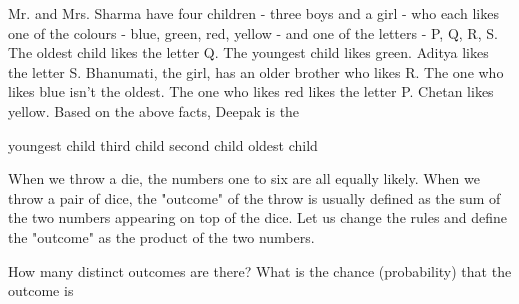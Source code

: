 \documentclass[12pt]{exam}
\begin{document}
\begin{questions}

\question Mr. and Mrs. Sharma have four children - three boys and a girl - who each likes one of the colours - blue, green, red, yellow - and one of the letters - P, Q, R, S. The oldest child likes the letter Q. The youngest child likes green. Aditya likes the letter S. Bhanumati, the girl, has an older brother who likes R. The one who likes blue isn't the oldest. The one who likes red likes the letter P. Chetan likes yellow. Based on the above facts, Deepak is the
\begin{choices}
    \choice youngest child
    \choice third child
    \choice second child
    \choice oldest child
\end{choices}

\question When we throw a die, the numbers one to six are all equally likely. When we throw a pair of dice, the "outcome" of the throw is usually defined as the sum of the two numbers appearing on top of the dice. Let us change the rules and define the "outcome" as the product of the two numbers.

How many distinct outcomes are there? What is the chance (probability) that the outcome is
\end{questions}
\end{document}
